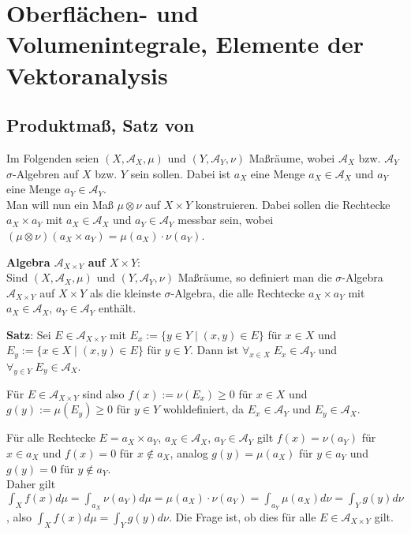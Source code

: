 \chapter{%
    Oberflächen- und Volumenintegrale, Elemente der Vektoranalysis%
}

\section{%
    Produktmaß, Satz von %
}

Im Folgenden seien $(X, \mathcal{A}_X, \mu)$ und $(Y, \mathcal{A}_Y, \nu)$
Maßräume, wobei $\mathcal{A}_X$ bzw. $\mathcal{A}_Y$ $\sigma$-Algebren auf
$X$ bzw. $Y$ sein sollen.
Dabei ist $a_X$ eine Menge $a_X \in \mathcal{A}_X$ und
$a_Y$ eine Menge $a_Y \in \mathcal{A}_Y$. \\
Man will nun ein Maß $\mu \otimes \nu$ auf $X \times Y$ konstruieren.
Dabei sollen die Rechtecke $a_X \times a_Y$ mit $a_X \in \mathcal{A}_X$ und
$a_Y \in \mathcal{A}_Y$ messbar sein, wobei
$(\mu \otimes \nu)(a_X \times a_Y) = \mu(a_X) \cdot \nu(a_Y)$.

\textbf{Algebra $\mathcal{A}_{X \times Y}$ auf $X \times Y$}: \\
Sind $(X, \mathcal{A}_X, \mu)$ und $(Y, \mathcal{A}_Y, \nu)$ Maßräume,
so definiert man die $\sigma$-Algebra $\mathcal{A}_{X \times Y}$ auf
$X \times Y$ als die kleinste $\sigma$-Algebra,
die alle Rechtecke $a_X \times a_Y$ mit
$a_X \in \mathcal{A}_X$, $a_Y \in \mathcal{A}_Y$ enthält.

\linie

\textbf{Satz}:
Sei $E \in \mathcal{A}_{X \times Y}$ mit
$E_x := \{y \in Y \;|\; (x, y) \in E\}$ für $x \in X$ und
$E_y := \{x \in X \;|\; (x, y) \in E\}$ für $y \in Y$.
Dann ist $\forall_{x \in X}\; E_x \in \mathcal{A}_Y$ und
$\forall_{y \in Y}\; E_y \in \mathcal{A}_X$.

Für $E \in \mathcal{A}_{X \times Y}$ sind also
$f(x) := \nu(E_x) \ge 0$ für $x \in X$ und
$g(y) := \mu(E_y) \ge 0$ für $y \in Y$ wohldefiniert,
da $E_x \in \mathcal{A}_Y$ und $E_y \in \mathcal{A}_X$.

\linie

Für alle Rechtecke $E = a_X \times a_Y$, $a_X \in \mathcal{A}_X$,
$a_Y \in \mathcal{A}_Y$ gilt $f(x) = \nu(a_Y)$ für $x \in a_X$ und
$f(x) = 0$ für $x \notin a_X$, analog $g(y) = \mu(a_X)$ für $y \in a_Y$ und
$g(y) = 0$ für $y \notin a_Y$. \\
Daher gilt $\int_X f(x) d\mu = \int_{a_X} \nu(a_Y) d\mu =
\mu(a_X) \cdot \nu(a_Y) = \int_{a_Y} \mu(a_X) d\nu = \int_Y g(y) d\nu$,
also $\int_X f(x) d\mu = \int_Y g(y) d\nu$.
Die Frage ist, ob dies für alle $E \in \mathcal{A}_{X \times Y}$ gilt.

